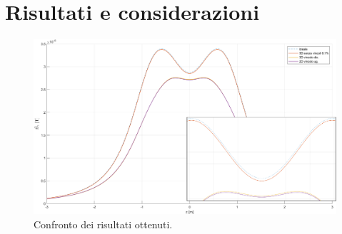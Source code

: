 \documentclass[a4paper, 11pt]{article}
\begin{document}
\newpage
\section*{Risultati e considerazioni}

\begin{figure}[H]
	\centering
		\includegraphics[width=16cm]{assets/figure12}
		\caption{Confronto dei risultati ottenuti.}
\end{figure}
\end{document}
